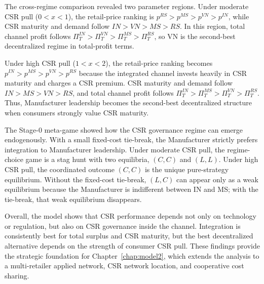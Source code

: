 The cross-regime comparison revealed two parameter regions. Under moderate CSR pull ($0<x<1$), the retail-price ranking is $p^{RS}>p^{MS}>p^{VN}>p^{IN}$, while CSR maturity and demand follow $IN>VN>MS>RS$. In this region, total channel profit follows $\Pi_T^{IN}>\Pi_T^{VN}>\Pi_T^{MS}>\Pi_T^{RS}$, so VN is the second-best decentralized regime in total-profit terms.

Under high CSR pull ($1<x<2$), the retail-price ranking becomes $p^{IN}>p^{MS}>p^{VN}>p^{RS}$ because the integrated channel invests heavily in CSR maturity and charges a CSR premium. CSR maturity and demand follow $IN>MS>VN>RS$, and total channel profit follows $\Pi_T^{IN}>\Pi_T^{MS}>\Pi_T^{VN}>\Pi_T^{RS}$. Thus, Manufacturer leadership becomes the second-best decentralized structure when consumers strongly value CSR maturity.

The Stage-0 meta-game showed how the CSR governance regime can emerge endogenously. With a small fixed-cost tie-break, the Manufacturer strictly prefers integration to Manufacturer leadership. Under moderate CSR pull, the regime-choice game is a stag hunt with two equilibria, $(C,C)$ and $(L,L)$. Under high CSR pull, the coordinated outcome $(C,C)$ is the unique pure-strategy equilibrium. Without the fixed-cost tie-break, $(L,C)$ can appear only as a weak equilibrium because the Manufacturer is indifferent between IN and MS; with the tie-break, that weak equilibrium disappears.

Overall, the model shows that CSR performance depends not only on technology or regulation, but also on CSR governance inside the channel. Integration is consistently best for total surplus and CSR maturity, but the best decentralized alternative depends on the strength of consumer CSR pull. These findings provide the strategic foundation for Chapter~\ref{chap:model2}, which extends the analysis to a multi-retailer applied network, CSR network location, and cooperative cost sharing.
